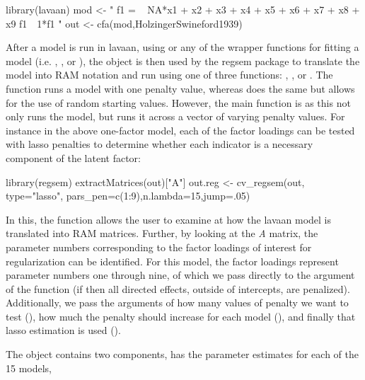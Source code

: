 \documentclass[article]{jss}
\begin{document}
\begin{CodeChunk}
\begin{CodeInput}
library(lavaan)
mod <- "
f1 = ~ NA*x1 + x2 + x3 + x4 + x5 + x6 + x7 + x8 + x9
f1~~1*f1
"
out <- cfa(mod,HolzingerSwineford1939)
\end{CodeInput}
\end{CodeChunk}

After a model is run in lavaan, using  or any of the
wrapper functions for fitting a model (i.e. , ,
or ), the object is then used by the regsem package to
translate the model into RAM notation and run using one of three
functions: , , or .
The  function runs a model with one penalty value,
whereas  does the same but allows for the use of
random starting values. However, the main function is 
as this not only runs the model, but runs it across a vector of varying
penalty values. For instance in the above one-factor model, each of the
factor loadings can be tested with lasso penalties to determine whether
each indicator is a necessary component of the latent factor:

\begin{CodeChunk}
\begin{CodeInput}
library(regsem)
extractMatrices(out)["A"]
out.reg <- cv_regsem(out, type="lasso", 
                    pars_pen=c(1:9),n.lambda=15,jump=.05)
\end{CodeInput}
\end{CodeChunk}

In this, the function  allows the user to
examine at how the lavaan model is translated into RAM matrices.
Further, by looking at the \textit{A} matrix, the parameter numbers
corresponding to the factor loadings of interest for regularization can
be identified. For this model, the factor loadings represent parameter
numbers one through nine, of which we pass directly to the
 argument of the  function (if
 then all directed effects, outside of intercepts,
are penalized). Additionally, we pass the arguments of how many values
of penalty we want to test (), how much the penalty
should increase for each model (), and finally that lasso
estimation is used ().

The  object contains two components, 
has the parameter estimates for each of the 15 models,
\end{document}
